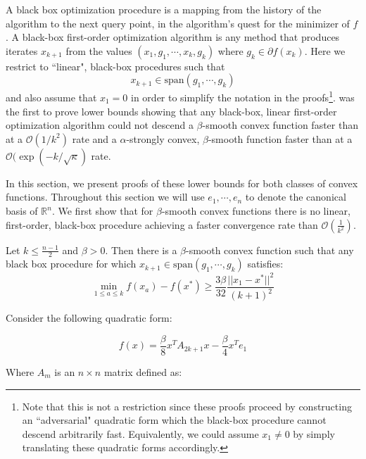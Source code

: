 A black box optimization procedure is a mapping from the history of the algorithm to the next query point, in the algorithm's quest for the minimizer of $f$. A black-box first-order optimization algorithm is any method that produces iterates $x_{k+1}$ from the values $(x_1, g_1, \cdots, x_k, g_k)$ where $g_k \in \partial f(x_k)$. Here we restrict to ``linear", black-box procedures such that
\begin{equation}
x_{k+1} \in \text{span}(g_1, \cdots, g_k)
\end{equation}
and also assume that $x_1 = 0$ in order to simplify the notation in the proofs\footnote{Note that this is not a restriction since these proofs proceed by constructing an ``adversarial" quadratic form which the black-box procedure cannot descend arbitrarily fast. Equivalently, we could assume $x_1 \neq 0$ by simply translating these quadratic forms accordingly.}.
\citet{blair1985problem} was the first to prove lower bounds showing that any black-box, linear first-order optimization algorithm could not descend a $\beta$-smooth convex function faster than at a  $\mathcal{O}(1/k^2)$ rate and a $\alpha$-strongly convex, $\beta$-smooth function faster than at a  $\mathcal{O}(\exp(-k/\sqrt{\kappa})$ rate.

In this section, we present proofs of these lower bounds for both classes of convex functions.
Throughout this section we will use $e_1, \cdots, e_n$ to denote the canonical basis of $\mathbb{R}^n$. We first show that for $\beta$-smooth convex functions there is no linear, first-order, black-box procedure achieving a faster convergence rate than $\mathcal{O}(\frac{1}{k^2})$. 

\begin{theorem}
Let $k \leq \frac{n-1}{2}$ and $\beta>0$. Then there is a $\beta$-smooth convex function such that any black box procedure for which $x_{k+1} \in \text{span}(g_1, \cdots, g_k)$ satisfies: 
\begin{equation}
\min_{1 \leq a \leq k } f(x_a ) - f(x^*) \geq \frac{3\beta}{32} \frac{||x_1 - x^*||^2}{(k+1)^2} 
\end{equation}
\label{thm:convex1proof}
\end{theorem}

\proofstart
Consider the following quadratic form:

\begin{equation}
    f(x) = \frac{\beta}{8}x^T A_{2k+1}x- \frac{\beta}{4}x^Te_1
\end{equation}

Where $A_m$ is an $n\times n$ matrix defined as:

